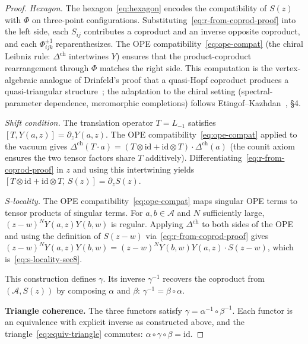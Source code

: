 \documentclass[11pt,reqno]{amsart}
\theoremstyle{definition}
\theoremstyle{remark}
\newcommand{\cA}{\mathcal{A}}
\newcommand{\id}{\mathrm{id}}
\numberwithin{equation}{section}
\begin{document}
\begin{proof}
\emph{Hexagon.}
The hexagon~\eqref{eq:hexagon} encodes the compatibility
of $S(z)$ with $\Phi$ on three-point configurations.
Substituting~\eqref{eq:r-from-coprod-proof} into the left
side, each $S_{ij}$ contributes a coproduct and an inverse
opposite coproduct, and each $\Phi_{ijk}^{\pm 1}$
reparenthesizes. The OPE
compatibility~\eqref{eq:ope-compat} (the chiral Leibniz
rule: $\Delta^{\mathrm{ch}}$ intertwines $Y$) ensures
that the product-coproduct rearrangement through $\Phi$
matches the right side. This computation is the
vertex-algebraic analogue of Drinfeld's proof that a
quasi-Hopf coproduct produces a quasi-triangular
structure~\cite{Drinfeld90}; the adaptation to the chiral
setting (spectral-parameter dependence, meromorphic
completions) follows
Etingof--Kazhdan~\cite{EK00}, \S4.

\emph{Shift condition.}
The translation operator $T = L_{-1}$ satisfies
$[T, Y(a,z)] = \partial_z Y(a,z)$.
The OPE compatibility~\eqref{eq:ope-compat} applied to
the vacuum gives
$\Delta^{\mathrm{ch}}(T \cdot a)
= (T \otimes \id + \id \otimes T) \cdot
\Delta^{\mathrm{ch}}(a)$ (the counit axiom ensures the
two tensor factors share $T$ additively).
Differentiating~\eqref{eq:r-from-coprod-proof} in $z$
and using this intertwining yields
$[T \otimes \id + \id \otimes T,\, S(z)]
= \partial_z S(z)$.

\emph{$S$-locality.}
The OPE compatibility~\eqref{eq:ope-compat} maps
singular OPE terms to tensor products of singular terms.
For $a, b \in \cA$ and $N$ sufficiently large,
$(z - w)^N Y(a,z) Y(b,w)$ is regular. Applying
$\Delta^{\mathrm{ch}}$ to both sides of the OPE and using
the definition of $S(z-w)$
via~\eqref{eq:r-from-coprod-proof} gives
$(z - w)^N Y(a,z) Y(b,w)
= (z - w)^N Y(b,w) Y(a,z) \cdot S(z - w)$,
which is~\eqref{eq:s-locality-sec8}.

This construction defines $\gamma$. Its inverse
$\gamma^{-1}$ recovers the coproduct from
$(\cA, S(z))$ by composing $\alpha$ and $\beta$:
$\gamma^{-1} = \beta \circ \alpha$.

\medskip
\noindent
\textbf{Triangle coherence.}
The three functors satisfy
$\gamma = \alpha^{-1} \circ \beta^{-1}$. Each functor
is an equivalence with explicit inverse as constructed
above, and the triangle~\eqref{eq:equiv-triangle}
commutes: $\alpha \circ \gamma \circ \beta = \id$.
\end{proof}
\end{document}
